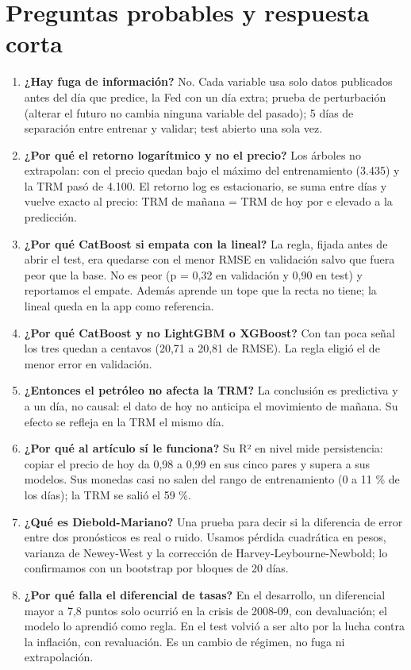 \documentclass[11pt,letterpaper]{article}
\begin{document}
\section*{Preguntas probables y respuesta corta}
\begin{enumerate}
\item \textbf{¿Hay fuga de información?} No. Cada variable usa solo datos publicados antes del día que predice, la Fed con un día extra; prueba de perturbación (alterar el futuro no cambia ninguna variable del pasado); 5 días de separación entre entrenar y validar; test abierto una sola vez.
\item \textbf{¿Por qué el retorno logarítmico y no el precio?} Los árboles no extrapolan: con el precio quedan bajo el máximo del entrenamiento (3.435) y la TRM pasó de 4.100. El retorno log es estacionario, se suma entre días y vuelve exacto al precio: TRM de mañana = TRM de hoy por e elevado a la predicción.
\item \textbf{¿Por qué CatBoost si empata con la lineal?} La regla, fijada antes de abrir el test, era quedarse con el menor RMSE en validación salvo que fuera peor que la base. No es peor (p = 0,32 en validación y 0,90 en test) y reportamos el empate. Además aprende un tope que la recta no tiene; la lineal queda en la app como referencia.
\item \textbf{¿Por qué CatBoost y no LightGBM o XGBoost?} Con tan poca señal los tres quedan a centavos (20,71 a 20,81 de RMSE). La regla eligió el de menor error en validación.
\item \textbf{¿Entonces el petróleo no afecta la TRM?} La conclusión es predictiva y a un día, no causal: el dato de hoy no anticipa el movimiento de mañana. Su efecto se refleja en la TRM el mismo día.
\item \textbf{¿Por qué al artículo sí le funciona?} Su R² en nivel mide persistencia: copiar el precio de hoy da 0,98 a 0,99 en sus cinco pares y supera a sus modelos. Sus monedas casi no salen del rango de entrenamiento (0 a 11 \% de los días); la TRM se salió el 59 \%.
\item \textbf{¿Qué es Diebold-Mariano?} Una prueba para decir si la diferencia de error entre dos pronósticos es real o ruido. Usamos pérdida cuadrática en pesos, varianza de Newey-West y la corrección de Harvey-Leybourne-Newbold; lo confirmamos con un bootstrap por bloques de 20 días.
\item \textbf{¿Por qué falla el diferencial de tasas?} En el desarrollo, un diferencial mayor a 7,8 puntos solo ocurrió en la crisis de 2008-09, con devaluación; el modelo lo aprendió como regla. En el test volvió a ser alto por la lucha contra la inflación, con revaluación. Es un cambio de régimen, no fuga ni extrapolación.

\end{enumerate}
\end{document}
